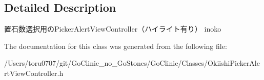 \subsection{Detailed Description}
置石数選択用のPickerAlertViewController（ハイライト有り）  inoko 

The documentation for this class was generated from the following file:\begin{DoxyCompactItemize}
\item 
/Users/toru0707/git/GoClinic\_\-no\_\-GoStones/GoClinic/Classes/OkiishiPickerAlertViewController.h\end{DoxyCompactItemize}
